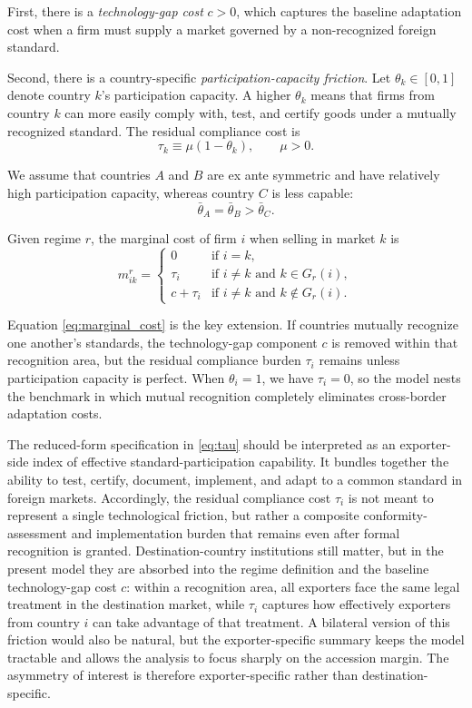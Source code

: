 First, there is a \emph{technology-gap cost} $c>0$, which captures the baseline adaptation cost when a firm must supply a market governed by a non-recognized foreign standard.

Second, there is a country-specific \emph{participation-capacity friction}. Let $\theta_k \in [0,1]$ denote country $k$'s participation capacity. A higher $\theta_k$ means that firms from country $k$ can more easily comply with, test, and certify goods under a mutually recognized standard. The residual compliance cost is
\begin{equation}
\tau_k \equiv \mu(1-\theta_k), \qquad \mu>0.
\label{eq:tau}
\end{equation}

We assume that countries $A$ and $B$ are ex ante symmetric and have relatively high participation capacity, whereas country $C$ is less capable:
\begin{equation}
\bar\theta_A=\bar\theta_B>\bar\theta_C.
\label{eq:theta_order}
\end{equation}

Given regime $r$, the marginal cost of firm $i$ when selling in market $k$ is
\begin{equation}
m_{ik}^r=
\begin{cases}
0 & \text{if } i=k,\\[4pt]
\tau_i & \text{if } i\neq k \text{ and } k \in G_r(i),\\[4pt]
c+\tau_i & \text{if } i\neq k \text{ and } k \notin G_r(i).
\end{cases}
\label{eq:marginal_cost}
\end{equation}

Equation \eqref{eq:marginal_cost} is the key extension. If countries mutually recognize one another's standards, the technology-gap component $c$ is removed within that recognition area, but the residual compliance burden $\tau_i$ remains unless participation capacity is perfect. When $\theta_i=1$, we have $\tau_i=0$, so the model nests the benchmark in which mutual recognition completely eliminates cross-border adaptation costs.

The reduced-form specification in \eqref{eq:tau} should be interpreted as an
exporter-side index of effective standard-participation capability. It bundles
together the ability to test, certify, document, implement, and adapt to a
common standard in foreign markets. Accordingly, the residual compliance cost
$\tau_i$ is not meant to represent a single technological friction, but rather
a composite conformity-assessment and implementation burden that remains even
after formal recognition is granted. Destination-country institutions still
matter, but in the present model they are absorbed into the regime definition
and the baseline technology-gap cost $c$: within a recognition area, all
exporters face the same legal treatment in the destination market, while
$\tau_i$ captures how effectively exporters from country $i$ can take advantage
of that treatment. A bilateral version of this friction would also be natural,
but the exporter-specific summary keeps the model tractable and allows the
analysis to focus sharply on the accession margin. The asymmetry of interest is
therefore exporter-specific rather than destination-specific.

